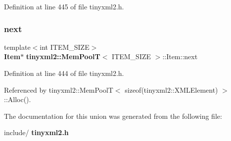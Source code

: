 Definition at line 445 of file tinyxml2.\+h.

\mbox{\label{uniontinyxml2_1_1_mem_pool_t_1_1_item_a5620107f518c60d6619e8662d4c9d643}} 
\subsubsection{next}
{\footnotesize\ttfamily template$<$int I\+T\+E\+M\+\_\+\+S\+I\+ZE$>$ \\
\textbf{ Item}$\ast$ \textbf{ tinyxml2\+::\+Mem\+PoolT}$<$ I\+T\+E\+M\+\_\+\+S\+I\+ZE $>$\+::Item\+::next}



Definition at line 444 of file tinyxml2.\+h.



Referenced by tinyxml2\+::\+Mem\+Pool\+T$<$ sizeof(tinyxml2\+::\+X\+M\+L\+Element) $>$\+::\+Alloc().



The documentation for this union was generated from the following file\+:\begin{DoxyCompactItemize}
\item 
include/\textbf{ tinyxml2.\+h}\end{DoxyCompactItemize}
